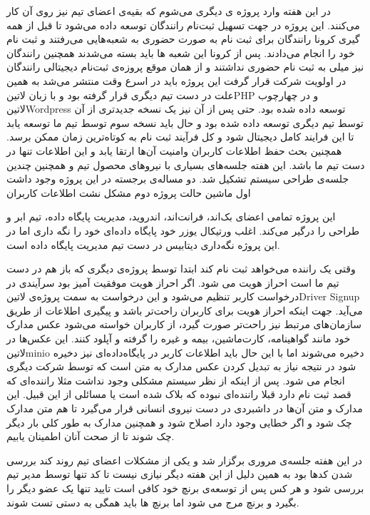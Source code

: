 \documentclass[a4]{report}
\begin{document}
در این هفته وارد پروژه ی دیگری می‌شوم که بقیه‌ی اعضای تیم نیز روی آن کار می‌کنند.
این پروژه در جهت تسهیل ثبت‌نام رانندگان توسعه داده می‌شود تا قبل از همه گیری کرونا رانندگان برای ثبت نام به صورت حضوری به شعبه‌هایی می‌رفتند و ثبت نام خود را انجام می‌دادند.
پس از کرونا این شعبه ها باید بسته می‌شدند همچنین رانندگان نیز میلی به ثبت نام حضوری نداشتند و از همان موقع پروزه‌ی ثبت‌نام دیجیتالی رانندگان در اولویت شرکت قرار گرفت این پروژه باید در اسرع وقت منتشر می‌شد
به همین علت در دست تیم دیگری قرار گرفته بود و با زبان ‌لاتین{PHP} و در چهارچوب ‌لاتین{Wordpress} توسعه داده شده بود.
حتی پس از آن نیز یک نسخه جدیدتری از آن توسط تیم دیگری توسعه داده شده بود و حال باید نسخه سوم توسط تیم ما توسعه یابد تا این فرایند کامل دیجیتال شود و کل فرآیند ثبت نام به کوتاه‌ترین زمان ممکن برسد.
همچنین بحث حفظ اطلاعات کاربران وامنیت آن‌ها ارتقا یابد و این اطلاعات تنها در دست تیم ما باشد.
این هفته جلسه‌های بسیاری با نیروهای محصول تیم و همچنین چندین جلسه‌ی طراحی سیستم تشکیل شد. دو مساله‌ی برجسته در این پروژه وجود داشت اول ماشین حالت پروژه دوم مشکل نشت اطلاعات کاربران

این پروژه تمامی اعضای بک‌اند، فرانت‌اند، اندروید، مدیریت پایگاه داده، تیم ابر و طراحی را درگیر می‌کند. اغلب ورتیکال یوزر خود پایگاه داده‌ای‌ خود را نگه داری اما در این پروژه نگه‌داری دیتابیس در دست تیم مدیریت پایگاه داده است.

وقتی یک راننده می‌خواهد ثبت نام کند ابتدا توسط پروژه‌ی دیگری که باز هم در دست تیم ما است احراز هویت می شود.
اگر احراز هویت موفقیت آمیز بود سرآیندی در درخواست کاربر تنظیم می‌شود و این درخواست به سمت پروژه‌ی ‌لاتین{Driver Signup} می‌آید.
جهت اینکه احراز هویت برای کاربران راحت‌تر باشد و پیگیری اطلاعات از طریق سازمان‌های مرتبط نیز راحت‌تر صورت گیرد، از کاربران خواسته می‌شود عکس مدارک خود مانند گواهینامه، کارت‌ماشین، بیمه و غیره را گرفته و آپلود کنند.
این عکس‌ها در ‌لاتین{minio} دخیره می‌شوند اما با این حال باید اطلاعات کاربر در پایگاه‌داده‌ای نیز دخیره شود در نتیجه نیاز به تبدیل کردن عکس مدارک به متن است که توسط شرکت دیگری انجام می شود.
پس از اینکه از نظر سیستم مشکلی وجود نداشت مثلا راننده‌ای که قصد ثبت نام دارد قبلا راننده‌ای نبوده که بلاک شده است یا مسائلی از این قبیل.
این مدارک و متن آن‌ها در داشبردی در دست نیروی انسانی قرار می‌گیرد تا هم متن مدارک چک شود و اگر خطایی وجود دارد اصلاح شود و همچنین مدارک به طور کلی بار دیگر چک شوند تا از صحت آنان اطمینان یابیم.

در این هفته جلسه‌ی مروری برگزار شد و یکی از مشکلات اعضای تیم روند کند بررسی شدن کدها بود به همین دلیل از این هفته دیگر نیازی نیست تا کد تنها توسط مدیر تیم بررسی شود
و هر کس پس از توسعه‌ی برنچ خود کافی است تایید تنها یک عضو دیگر را بگیرد و برنچ مرج می شود اما برنچ ها باید همگی به دستی تست شوند.
\end{document}
